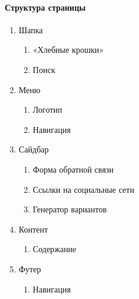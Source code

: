 \paragraph{Структура страницы}
\begin{enumerate}
	\item Шапка
	\begin{enumerate}
		\item «Хлебные крошки»
		\item Поиск
	\end{enumerate}

	\item Меню
	\begin{enumerate}
		\item Логотип
		\item Навигация
	\end{enumerate}

	\item Сайдбар
	\begin{enumerate}
		\item Форма обратной связи
		\item Ссылки на социальные сети
		\item Генератор вариантов
	\end{enumerate}

	\item Контент
	\begin{enumerate}
		\item Содержание
	\end{enumerate}

	\item Футер
	\begin{enumerate}
		\item Навигация
	\end{enumerate}
\end{enumerate}

